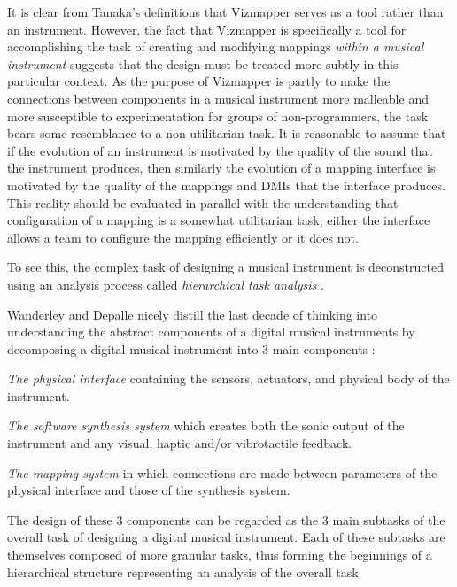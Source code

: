 It is clear from Tanaka's definitions that Vizmapper serves as a tool rather than an instrument. However, the fact that Vizmapper is specifically a tool for accomplishing the task of creating and modifying mappings \emph{within a musical instrument} suggests that the design must be treated more subtly in this particular context. As the purpose of Vizmapper is partly to make the connections between components in a musical instrument more malleable and more susceptible to experimentation for groups of non-programmers, the task bears some resemblance to a non-utilitarian task. It is reasonable to assume that if the evolution of an instrument is motivated by the quality of the sound that the instrument produces, then similarly the evolution of a mapping interface is motivated by the quality of the mappings and DMIs that the interface produces. This reality should be evaluated in parallel with the understanding that configuration of a mapping is a somewhat utilitarian task; either the interface allows a team to configure the mapping efficiently or it does not.

To see this, the complex task of designing a musical instrument is deconstructed using an analysis process called \emph{hierarchical task analysis} \cite{annett1967}. 

Wanderley and Depalle nicely distill the last decade of thinking into understanding the abstract components of a digital musical instruments by decomposing a digital musical instrument into 3 main components \cite{wanderley2004}:

\begin{description}
\item \emph{The physical interface} containing the sensors, actuators, and physical body of the instrument.
\item \emph{The software synthesis system} which creates both the sonic output of the instrument and any visual, haptic and/or vibrotactile feedback.
\item \emph{The mapping system} in which connections are made between parameters of the physical interface and those of the synthesis system.
\end{description}

The design of these 3 components can be regarded as the 3 main subtasks of the overall task of designing a digital musical instrument. Each of these subtasks are themselves composed of more granular tasks, thus forming the beginnings of a hierarchical structure representing an analysis of the overall task.

